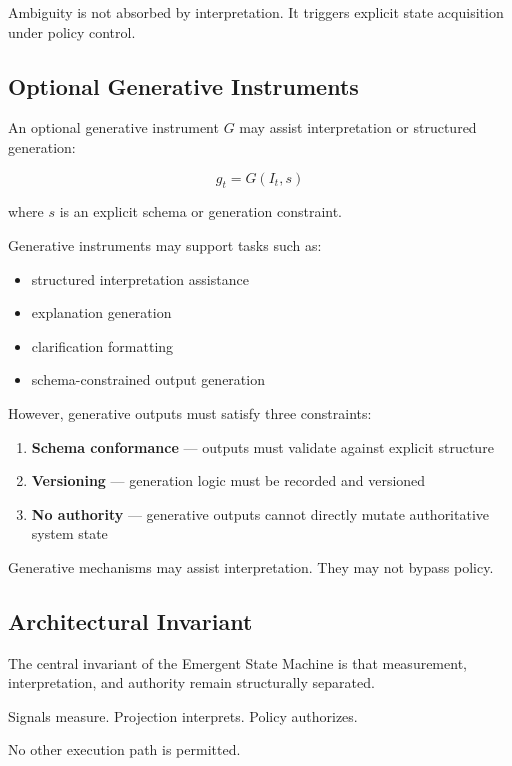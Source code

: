 \documentclass[11pt]{article}
\begin{document}
Ambiguity is not absorbed by interpretation. It triggers explicit state acquisition under policy control.

\subsection{Optional Generative Instruments}

An optional generative instrument $G$ may assist interpretation or structured generation:

\[
g_t = G(I_t, s)
\]

where $s$ is an explicit schema or generation constraint.

Generative instruments may support tasks such as:

\begin{itemize}
  \item structured interpretation assistance
  \item explanation generation
  \item clarification formatting
  \item schema-constrained output generation
\end{itemize}

However, generative outputs must satisfy three constraints:

\begin{enumerate}
  \item \textbf{Schema conformance} — outputs must validate against explicit structure
  \item \textbf{Versioning} — generation logic must be recorded and versioned
  \item \textbf{No authority} — generative outputs cannot directly mutate authoritative system state
\end{enumerate}

Generative mechanisms may assist interpretation. They may not bypass policy.

\subsection{Architectural Invariant}

The central invariant of the Emergent State Machine is that measurement, interpretation, and authority remain structurally separated.

Signals measure. Projection interprets. Policy authorizes.

No other execution path is permitted.

\end{document}

